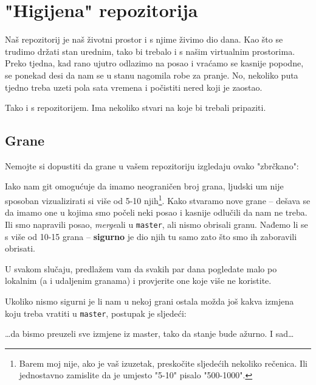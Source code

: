 \chapter*{"Higijena" repozitorija}

Naš repozitorij je naš životni prostor i s njime živimo dio dana.
Kao što se trudimo držati stan urednim, tako bi trebalo i s našim virtualnim prostorima.
Preko tjedna, kad rano ujutro odlazimo na posao i vraćamo se kasnije popodne, se ponekad desi da nam se u stanu nagomila robe za pranje.
No, nekoliko puta tjedno treba uzeti pola sata vremena i počistiti nered koji je zaostao.

Tako i s repozitorijem.
Ima nekoliko stvari na koje bi trebali pripaziti.

\section*{Grane}

Nemojte si dopustiti da grane u vašem repozitoriju izgledaju ovako "zbrčkano":



Iako nam git omogućuje da imamo neograničen broj grana, ljudski um nije sposoban vizualizirati si više od 5-10 njih\footnote{Barem moj nije, ako je vaš izuzetak, preskočite sljedećih nekoliko rečenica. Ili jednostavno zamislite da je umjesto "5-10" pisalo "500-1000".}.
Kako stvaramo nove grane -- dešava se da imamo one u kojima smo počeli neki posao i kasnije odlučili da nam ne treba.
Ili smo napravili posao, \emph{merge}ali u \verb+master+, ali nismo obrisali granu.
Nađemo li se s više od 10-15 grana -- \textbf{sigurno} je dio njih tu samo zato što smo ih zaboravili obrisati.

U svakom slučaju, predlažem vam da svakih par dana pogledate malo po lokalnim (a i udaljenim granama) i provjerite one koje više ne koristite.

Ukoliko nismo sigurni je li nam u nekoj grani ostala možda još kakva izmjena koju treba vratiti u \verb+master+, postupak je sljedeći:


\dots{}da bismo preuzeli sve izmjene iz master, tako da stanje bude ažurno.
I sad\dots


